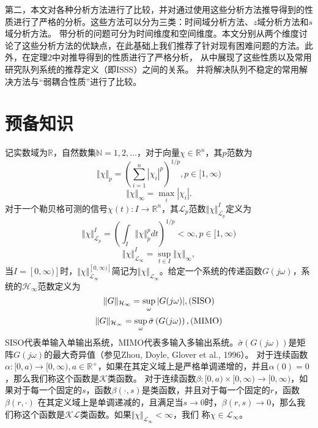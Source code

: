 \begin{translation}
  第二，本文对各种分析方法进行了比较，并对通过使用这些分析方法推导得到的性质进行了严格的分析。这些方法可以分为三类：时间域分析方法、$z$域分析方法和$s$域分析方法。
  带分析的问题可分为时间维度和空间维度。本文分别从两个维度讨论了这些分析方法的优缺点，在此基础上我们推荐了针对现有困难问题的方法。此外，在定理2中对推导得到的性质进行了严格分析，
  从中展现了这些性质以及常用研究队列系统的推荐定义（即ISSS）之间的关系。 并将解决队列不稳定的常用解决方法与“弱耦合性质”进行了比较。

\section{预备知识}
  记实数域为$\mathbb{R}$，自然数集$\mathbb{N}={1, 2, \dots}$，对于向量$\chi \in \mathbb{R}^n$，其$p$范数为
  \begin{equation}
    \Vert\chi\Vert_p = \left( \sum_{i=1}^n{|\chi_i|^p} \right) ^{1/p}, p \in [1, \infty)
    \label{eq:appendix-equation-1}
  \end{equation}
  \begin{equation}
    \Vert\chi\Vert_\infty = \max_{i} |\chi_i|.
    \label{eq:appendix-equation-2}
  \end{equation}
  对于一个勒贝格可测的信号$\chi(t):I \rightarrow \mathbb{R}^n$，其$\mathcal{L}_p$范数$\Vert\chi\Vert^I_{\mathcal{L}_p}$定义为
  \begin{equation}
    \Vert\chi\Vert^I_{\mathcal{L}_p} = \left( \int_I{\Vert\chi\Vert_p^p dt} \right) ^{1/p} < \infty, p \in [1, \infty)
    \label{eq:appendix-equation-3}
  \end{equation}
  \begin{equation}
    \Vert\chi\Vert^I_{\mathcal{L}_\infty} = \sup_{t \in I} \Vert\chi\Vert_\infty,
    \label{eq:appendix-equation-4}
  \end{equation}
  当$I=[0, \infty)]$时，$\Vert\chi\Vert^{[0, \infty)]}_{\mathcal{L}_\infty}$简记为$\Vert\chi\Vert_{\mathcal{L}_\infty}$。给定一个系统的传递函数$G(j\omega)$，系统的$\mathcal{H}_\infty$范数定义为
  \begin{equation}
    \Vert G \Vert_{\mathcal{H}_\infty} = \sup_{\omega}|G(j\omega)|, {\rm (SISO)}
    \label{eq:appendix-equation-5}
  \end{equation}
  \begin{equation}
    \Vert G \Vert_{\mathcal{H}_\infty} = \sup_{\omega}\bar{\sigma} \left( G(j\omega) \right), {\rm (MIMO)}
    \label{eq:appendix-equation-6}
  \end{equation}
  SISO代表单输入单输出系统，MIMO代表多输入多输出系统。$\bar{\sigma} \left( G(j\omega) \right)$是矩阵$G(j\omega)$的最大奇异值（参见Zhou, Doyle, Glover et al., 1996）。
  对于连续函数$\alpha:[0, a) \rightarrow [0, \infty), a \in \mathbb{R}^+$，如果在其定义域上是严格单调递增的，并且$\alpha(0) = 0$，那么我们称这个函数是$\mathcal{K}$类函数。
  对于连续函数$\beta:[0, a) \times [0, \infty) \rightarrow [0, \infty)$，如果对于每一个固定的$s$，函数$\beta(\cdot, s)$是$\mathcal{}$类函数，并且对于每一个固定的$r$，函数$\beta(r, \cdot)$
  在其定义域上是单调递减的，且满足当$s \rightarrow 0$时，$\beta (r, s) \rightarrow 0$，那么我们称这个函数是$\mathcal{KL}$类函数。如果$\Vert\chi\Vert_{\mathcal{L}_\infty} < \infty$，我们
  称$\chi \in \mathcal{L}_\infty$。


\end{translation}
